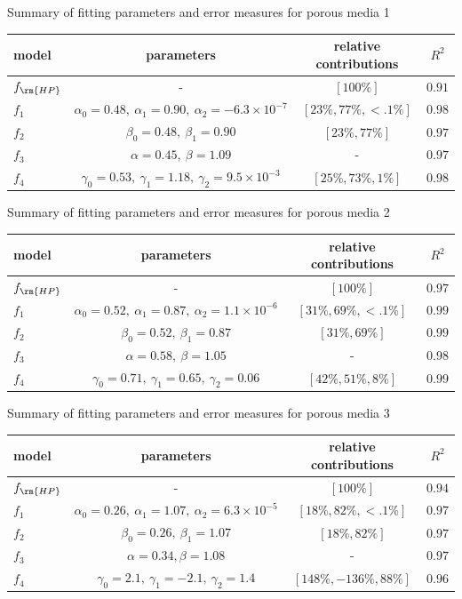\documentclass[draft,jgrga]{agutexSI2019}
\begin{document}
\begin{article}
Summary of fitting parameters and error measures for porous media 1\\
\begin{tabular}{l|c|c|c}
\hline
model & parameters  & relative contributions & $R^2$  \\
\hline
$f_{\rm{HP}}$&-  									& $[100\%]$ &  $0.91$  \\
$f_1$		&$\alpha_0 = 0.48,~\alpha_1 = 0.90,~\alpha_2 = -6.3\times 10^{-7} $ 	& $[23\%,77\%,<.1\%]$ & $0.98$ \\
$f_2$ 		&$\beta_0 = 0.48,~\beta_1 = 0.90 $				&  $[23\%,77\%]$ & $0.97$\\
$f_3$ 		&$\alpha = 0.45,~\beta = 1.09 $					& -  & $0.97$\\
$f_4$ 		&$\gamma_0 = 0.53,~\gamma_1 = 1.18,~\gamma_2 = 9.5\times10^{-3} $ & $[25\%,73\%,1\%]$ & $0.98$\\
\end{tabular}

\vspace{1cm}

Summary of fitting parameters and error measures for porous media 2\\
\begin{tabular}{l|c|c|c}
\hline
model & parameters  & relative contributions & $R^2$  \\
\hline
$f_{\rm{HP}}$&-  									& $[100\%]$ &  $0.97$  \\
$f_1$		&$\alpha_0 = 0.52,~\alpha_1 = 0.87,~\alpha_2 = 1.1\times 10^{-6} $ 	& $[31\%,69\%,<.1\%]$ & $0.99$ \\
$f_2$ 		&$\beta_0 = 0.52,~\beta_1 = 0.87 $				&  $[31\%,69\%]$ & $0.99$\\
$f_3$ 		&$\alpha = 0.58,~\beta = 1.05 $					& -  & $0.98$\\
$f_4$ 		&$\gamma_0 = 0.71,~\gamma_1 = 0.65,~\gamma_2 = 0.06 $ & $[42\%,51\%,8\%]$ & $0.99$\\
\end{tabular}

\vspace{1cm}


Summary of fitting parameters and error measures for porous media 3\\
\begin{tabular}{l|c|c|c}
\hline
model & parameters  & relative contributions & $R^2$  \\
\hline
$f_{\rm{HP}}$&-  									& $[100\%]$ &  $0.94$  \\
$f_1$		&$\alpha_0 = 0.26,~\alpha_1 = 1.07,~\alpha_2 = 6.3\times 10^{-5} $ 	& $[18\%,82\%,<.1\%]$ & $0.97$ \\
$f_2$ 		&$\beta_0 = 0.26,~\beta_1 = 1.07 $				&  $[18\%,82\%]$ & $0.97$\\
$f_3$ 		&$\alpha = 0.34, \beta = 1.08 $					& -  & $0.97$\\
$f_4$ 		&$\gamma_0 = 2.1,~\gamma_1 = -2.1,~\gamma_2 = 1.4 $ & $[148\%,-136\%,88\%]$ & $0.96$\\
\end{tabular}


\end{article}
\end{document}
